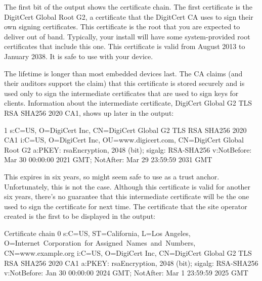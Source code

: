 The first bit of the output shows the certificate chain.
The first certificate is the DigitCert Global Root G2, a certificate that the DigitCert CA uses to sign their own signing certificates.
This certificate is the root that you are expected to deliver out of band.
Typically, your  install will have some system-provided root certificates that include this one.
This certificate is valid from August 2013 to January 2038.
It is  safe to use with your device.

The lifetime is longer than most embedded devices last.
The CA claims (and their auditors support the claim) that this certificate is stored securely and is used only to sign the intermediate certificates that are used to sign keys for clients.
Information about the intermediate certificate, DigiCert Global G2 TLS RSA SHA256 2020 CA1, shows up later in the output:

\begin{console}
 1 s:C=US, O=DigiCert Inc, CN=DigiCert Global G2 TLS RSA SHA256 2020 CA1
   i:C=US, O=DigiCert Inc, OU=www.digicert.com, CN=DigiCert Global Root G2
   a:PKEY: rsaEncryption, 2048 (bit); sigalg: RSA-SHA256
   v:NotBefore: Mar 30 00:00:00 2021 GMT; NotAfter: Mar 29 23:59:59 2031 GMT
\end{console}

This expires in six years, so might seem safe to use as a trust anchor.
Unfortunately, this is not the case.
Although this certificate is valid for another six years, there's no guarantee that this intermediate certificate will be the one used to sign the certificate for  next time.
The certificate that the site operator created is the first to be displayed in the output:

\begin{console}
Certificate chain
 0 s:C=US, ST=California, L=Los Angeles, O=Internet Corporation for
        Assigned Names and Numbers, CN=www.example.org
   i:C=US, O=DigiCert Inc, CN=DigiCert Global G2 TLS RSA SHA256 2020 CA1
   a:PKEY: rsaEncryption, 2048 (bit); sigalg: RSA-SHA256
   v:NotBefore: Jan 30 00:00:00 2024 GMT; NotAfter: Mar  1 23:59:59 2025 GMT
\end{console}

